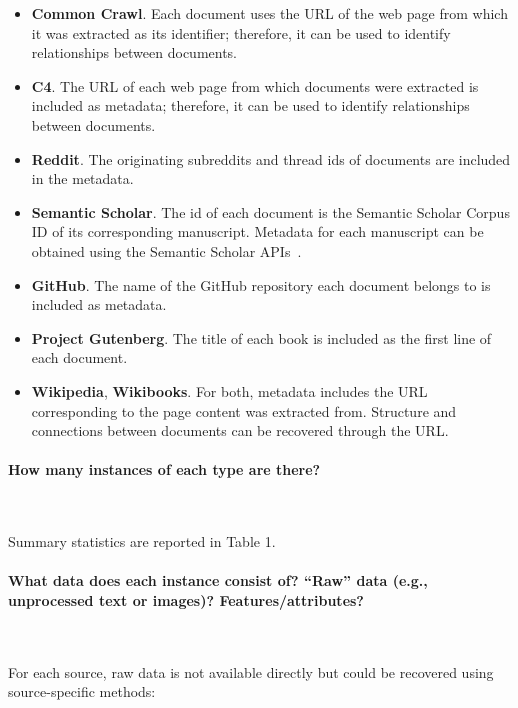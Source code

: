 \documentclass{article}
\begin{document}
\begin{itemize}[leftmargin=1em]
    \item \textbf{Common Crawl}. Each document uses the URL of the web page from which it was extracted as its identifier; therefore, it can be used to identify relationships between documents.
    \item \textbf{C4}. The URL of each web page from which documents were extracted is included as metadata; therefore, it can be used to identify relationships between documents.
    \item \textbf{Reddit}. The originating subreddits and thread ids of documents are included in the metadata. 
    \item \textbf{Semantic Scholar}. The id of each document is the Semantic Scholar Corpus ID of its corresponding manuscript. Metadata for each manuscript can be obtained using the Semantic Scholar APIs~\citep{kinney2023semantic}.
    \item \textbf{GitHub}. The name of the GitHub repository each document belongs to is included as metadata. 
    \item \textbf{Project Gutenberg}. The title of each book is included as the first line of each document.
    \item \textbf{Wikipedia}, \textbf{Wikibooks}. For both, metadata includes the URL corresponding to the page content was extracted from. Structure and connections between documents can be recovered through the URL.
\end{itemize}

\paragraph{How many instances of each type are there?}~

Summary statistics are reported in Table 1.

\paragraph{What data does each instance consist of? ``Raw'' data (e.g., unprocessed text or images)? Features/attributes?}~

For each source, raw data is not available directly but could be recovered using source-specific methods:
\end{document}

